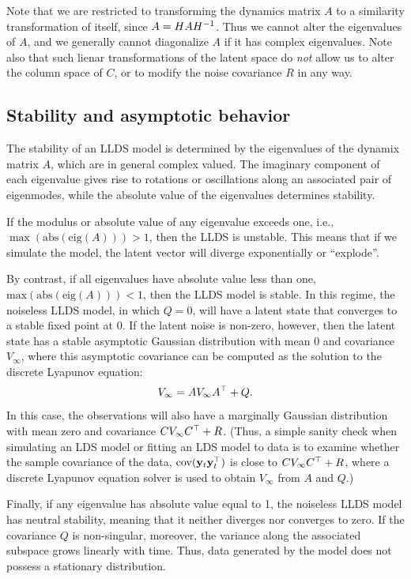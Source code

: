 \documentclass[10pt]{article}
\newcommand{\vy}{\mathbf{y}}
\newcommand{\cov}{\mathrm{cov}}
\begin{document}
Note that we are restricted to transforming the
dynamics matrix $A$ to a similarity transformation of itself, since
$A= H A H^{-1}$. Thus we cannot alter the eigenvalues of $A$, and we
generally cannot diagonalize $A$ if it has complex eigenvalues.  Note also that
such lienar transformations of the latent space do {\it not} allow us to alter the column space
of $C$, or to modify the noise covariance $R$ in any way.


\subsection{Stability and asymptotic behavior}

The stability of an LLDS model is determined by the eigenvalues of the
dynamix matrix $A$, which are in general complex valued.  The
imaginary component of each eigenvalue gives rise to rotations or
oscillations along an associated pair of eigenmodes, while the
absolute value of the eigenvalues determines stability.

If the modulus or absolute value of any eigenvalue exceeds one,
i.e., $\max(\mathrm{abs}(\mathrm{eig}(A)))>1$, then the LLDS is
unstable. This means that if we simulate the model, the latent vector
will diverge exponentially or ``explode''.

By contrast, if all eigenvalues have absolute value less than one,
$\mathrm{max}(\mathrm{abs}(\mathrm{eig}(A)))<1$, then the LLDS model
is stable.  In this regime, the noiseless LLDS model, in which $Q=0$,
will have a latent state that converges to a stable fixed point at 0.
If the latent noise is non-zero, however, then the latent state has a
stable asymptotic Gaussian distribution with mean 0 and covariance
$V_\infty$, where this asymptotic covariance can be computed as the
solution to the discrete Lyapunov equation:
\begin{equation}
  \label{eq:17}
  V_\infty = A V_\infty A^\top + Q.
\end{equation}
In this case, the observations will also have a marginally Gaussian
distribution with mean zero and covariance $C V_\infty C^\top + R$.
(Thus, a simple sanity check when simulating an LDS model or fitting
an LDS model to data is to examine whether the sample covariance of
the data, $\cov(\vy_t \vy_t\trp)$ is close to $C V_\infty C^\top +R$,
where a discrete Lyapunov equation solver is used to obtain $V_\infty$
from $A$ and $Q$.)

Finally, if any eigenvalue has absolute value equal to 1, the
noiseless LLDS model has neutral stability, meaning that it neither
diverges nor converges to zero.  If the covariance $Q$ is
non-singular, moreover, the variance along the associated subspace
grows linearly with time.  Thus, data generated by the model does not possess a
stationary distribution.
\end{document}
